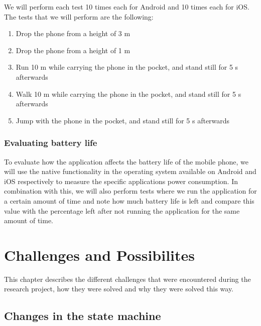 \documentclass[12pt, a4paper, onecolumn]{article}
\begin{document}
	We will perform each test 10 times each for Android and 10 times each for iOS. The tests that we will perform are the following:
	
	\begin{enumerate}
		\item Drop the phone from a height of 3 m 
		\item Drop the phone from a height of 1 m
		\item Run 10 m while carrying the phone in the pocket, and stand still for 5 s afterwards
		\item Walk 10 m while carrying the phone in the pocket, and stand still for 5 s afterwards
		\item Jump with the phone in the pocket, and stand still for 5 s afterwards
	\end{enumerate}
	
	\subsubsection{Evaluating battery life}
	
	To evaluate how the application affects the battery life of the mobile phone, we will use the native functionality in the operating system available on Android and iOS respectively to measure the specific applications power consumption.
	In combination with this, we will also perform tests where we run the application for a certain amount of time and note how much battery life is left and compare this value with the percentage left after not running the application for the same amount of time.
	
	\newpage
	\section{Challenges and Possibilites}
	
	This chapter describes the different challenges that were encountered during the research project, how they were solved and why they were solved this way.
	
	\subsection{Changes in the state machine}
	
\end{document}
